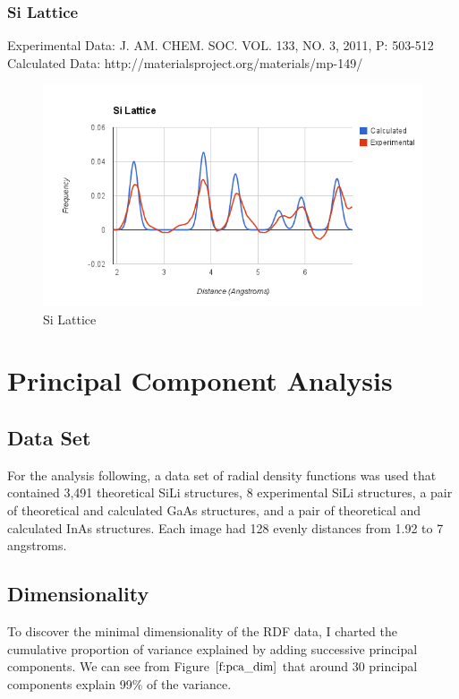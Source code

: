 \documentclass[12pt,letterpaper]{article}
\begin{document}
\subsubsection{Si Lattice}
\noindent Experimental Data: J. AM. CHEM. SOC. VOL. 133, NO. 3, 2011, P:
503-512\\
\noindent Calculated Data: http://materialsproject.org/materials/mp-149/ \\
\begin{figure}[ht]
  \begin{center}
    \includegraphics[scale=0.7]{figs/si_lattice_comparison.png}
    \caption{Si Lattice}
  \end{center}
\end{figure}

\pagebreak

\section{Principal Component Analysis}
\subsection{Data Set}
For the analysis following, a data set of radial density functions was used that
contained 3,491 theoretical SiLi structures, 8 experimental SiLi structures, a
pair of theoretical and calculated GaAs structures, and a pair of theoretical and
calculated InAs structures. Each image had 128 evenly distances from 1.92 to
7 angstroms.

\subsection{Dimensionality}
To discover the minimal dimensionality of the RDF data, I charted the cumulative
proportion of variance explained by adding successive principal components. We
can see from Figure $\ref{f:pca_dim}$ that around 30 principal components explain
99\% of the variance. 
\end{document}

